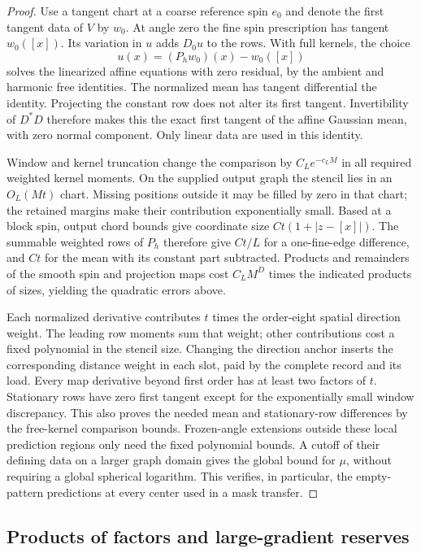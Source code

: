 \begin{proof}
Use a tangent chart at a coarse reference spin $e_0$ and denote the
first tangent data of $V$ by $w_0$.  At angle zero the fine spin
prescription has tangent $w_0([x])$.  Its variation in $u$ adds
$D_0u$ to the rows.  With full kernels, the choice
\[
 u(x)=(P_hw_0)(x)-w_0([x])
\]
solves the linearized affine equations with zero residual, by the
ambient and harmonic free identities.  The normalized mean has
tangent differential the identity.  Projecting the constant row does
not alter its first tangent.  Invertibility of $D^*D$ therefore makes
this the exact first tangent of the affine Gaussian mean, with zero
normal component.  Only linear data are used in this identity.

Window and kernel truncation change the comparison by
$C_Le^{-c_LM}$ in all required weighted kernel moments.  On the
supplied output graph the stencil lies in an $O_L(Mt)$ chart.  Missing
positions outside it may be filled by zero in that chart; the retained
margins make their contribution exponentially small.  Based at a
block spin, output chord bounds give coordinate size
$Ct(1+|z-[x]|)$.  The summable weighted rows of $P_h$ therefore give
$Ct/L$ for a one-fine-edge difference, and $Ct$ for the mean with its
constant part subtracted.  Products and remainders of the smooth spin
and projection maps cost $C_LM^D$ times the indicated products of
sizes, yielding the quadratic errors above.

Each normalized derivative contributes $t$ times the order-eight
spatial direction weight.  The leading row moments sum that weight;
other contributions cost a fixed polynomial in the stencil size.
Changing the direction anchor inserts the corresponding distance
weight in each slot, paid by the complete record and its load.  Every
map derivative beyond first order has at least two factors of $t$.
Stationary rows have zero first tangent except for the exponentially
small window discrepancy.  This also proves the needed mean and
stationary-row differences by the free-kernel comparison bounds.
Frozen-angle extensions outside these local prediction regions only
need the fixed polynomial bounds.  A cutoff of their defining data
on a larger graph domain gives the global bound for $\mu$, without
requiring a global spherical logarithm.  This verifies, in particular,
the empty-pattern predictions at every center used in a mask transfer.
\end{proof}

\subsection{Products of factors and large-gradient reserves}
\label{subsec:rg-products}

